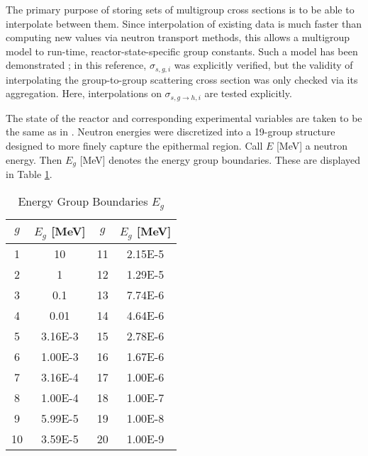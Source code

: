 \documentclass{physor2012}
\begin{document}
The primary purpose of storing sets of multigroup cross sections is
to be able to interpolate between them.  Since interpolation of existing
data is much faster than computing new values via neutron
transport methods, this allows a multigroup model to
run-time, reactor-state-specific group constants.  Such a model has been
demonstrated \cite{}; in this reference, $\sigma_{s,g,i}$ was explicitly
verified, but the validity of interpolating the group-to-group scattering
cross section was only checked via its aggregation.  Here, interpolations on
$\sigma_{s,g\to h,i}$ are tested explicitly.

The state of the reactor and corresponding experimental variables are taken
to be the same as in \cite{}.  Neutron energies were discretized into a 19-group
structure designed to more finely capture the epithermal region.  Call $E$ [MeV]
a neutron energy. Then $E_g$ [MeV] denotes the energy group boundaries.
These are displayed in Table \ref{group_boundaries}.
\begin{table}[htbp]
\begin{center}
\caption{Energy Group Boundaries $E_g$}
\label{group_boundaries}
\begin{tabular}{|c|c||c|c|}
\hline
\textbf{$g$} & \textbf{$E_g$ [MeV]} & \textbf{$g$} & \textbf{$E_g$ [MeV]} \\
\hline
1  & 10      & 11 & 2.15E-5 \\
2  & 1       & 12 & 1.29E-5 \\
3  & 0.1     & 13 & 7.74E-6 \\
4  & 0.01    & 14 & 4.64E-6 \\
5  & 3.16E-3 & 15 & 2.78E-6 \\
6  & 1.00E-3 & 16 & 1.67E-6 \\
7  & 3.16E-4 & 17 & 1.00E-6 \\
8  & 1.00E-4 & 18 & 1.00E-7 \\
9  & 5.99E-5 & 19 & 1.00E-8 \\
10 & 3.59E-5 & 20 & 1.00E-9 \\
\hline
\end{tabular}
\end{center}
\end{table}
\end{document}

